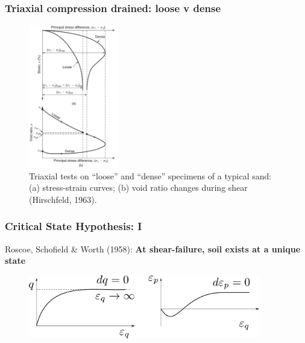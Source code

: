 \documentclass[notes]{beamer}
\begin{document}
\begin{frame}
	\frametitle{Triaxial compression drained: loose v dense}
	\begin{figure}
		\includegraphics[width=0.35\textwidth]{figs/tx-drained-loose-dense.png}
		\caption*{Triaxial tests on “loose” and “dense” specimens of a typical sand: (a) stress-strain curves; (b) void
			ratio changes during shear (Hirschfeld, 1963).}
	\end{figure}
\end{frame}

\begin{frame}
\frametitle{Critical State Hypothesis: I}
Roscoe, Schofield \& Worth (1958): \textbf{At shear-failure, soil exists at a unique state}
\begin{figure}
	\includegraphics[width=0.9\textwidth]{figs/critical-state.png}
\end{figure}
\end{frame}
\end{document}
